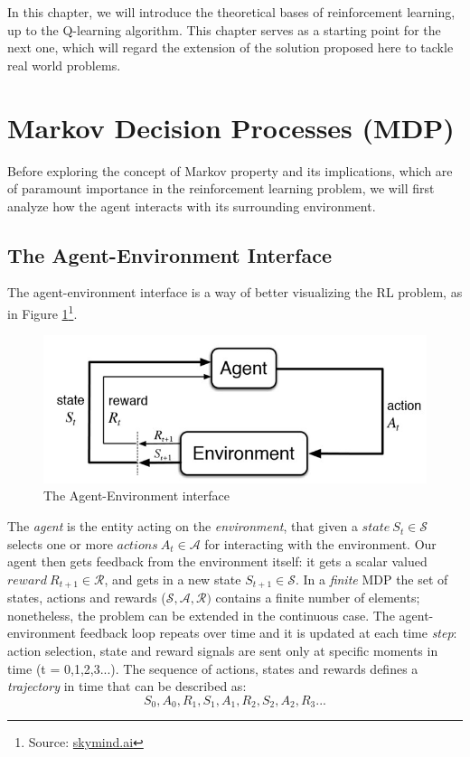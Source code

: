 
\label{ch:rl}

In this chapter, we will introduce the theoretical bases of reinforcement learning, up to the Q-learning algorithm. This chapter serves as a starting point for the next one, which will regard the extension of the solution proposed here to tackle real world problems.
\section{Markov Decision Processes (MDP)}
\label{sec:MDP}
Before exploring the concept of Markov property and its implications, which are of paramount importance in the reinforcement learning problem, we will first analyze how the agent interacts with its surrounding environment.
\subsection{The Agent-Environment Interface}

The agent-environment interface is a way of better visualizing the RL problem, as in Figure \ref{fig:agentenvironment}\footnote{Source: \href{https://skymind.ai/wiki/deep-reinforcement-learning}{skymind.ai}}.

\begin{figure}[h!]
	\centering
	\includegraphics[width=12cm]{images/AgentEnvironment.jpg}
	\caption{The Agent-Environment interface}
	\label{fig:agentenvironment}
\end{figure}
 
The \textit{agent} is the entity acting on the \textit{environment}, that given a $state \ S_t \in \mathcal{S}$ selects one or more $actions \ A_t \in \mathcal{A}$ for interacting with the environment. Our agent then gets feedback from the environment itself: it gets a scalar valued $reward \ R_{t+1} \in \mathcal{R}$, and gets in a new state $S_{t+1} \in \mathcal{S}$. In a \textit{finite} MDP the set of states, actions and rewards ($\mathcal{S},\mathcal{A},\mathcal{R})$ contains a finite number of elements; nonetheless, the problem can be extended in the continuous case. The agent-environment feedback loop repeats over time and it is updated at each time \textit{step}: action selection, state and reward signals are sent only at specific moments in time (t = 0,1,2,3...). The sequence of actions, states and rewards defines a \textit{trajectory} in time that can be described as: 
\begin{equation}
	S_0, A_0, R_1, S_1, A_1, R_2, S_2, A_2, R_3... 
\end{equation}

